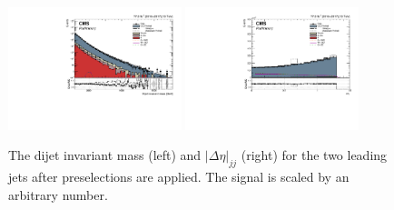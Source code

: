 \begin{figure}[h!]
\centering
\includegraphics[width=0.450\textwidth]{figures/analysis/search3/AN-17-303/controlPlots/looseSel_Dijet_invariant_mass.pdf}
\includegraphics[width=0.450\textwidth]{figures/analysis/search3/AN-17-303/controlPlots/looseSel_Deltaeta.pdf}
\caption{The dijet invariant mass (left) and $|\Delta\eta|_{jj}$ (right) for the two leading jets after preselections are applied. The signal is scaled by an arbitrary number.}
\label{fig:Mjj-all}
\end{figure}

